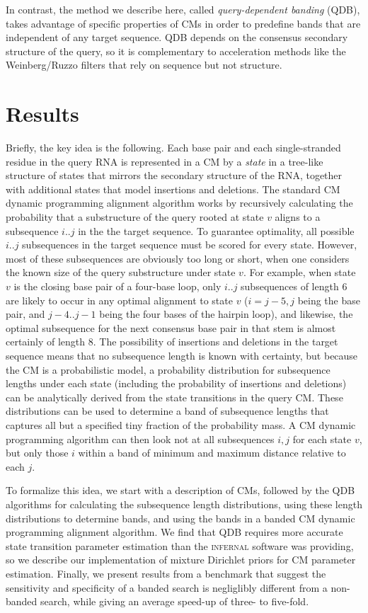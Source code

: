 \documentclass[11pt]{article}
\begin{document}
In contrast, the method we describe here, called \emph{query-dependent
banding} (QDB), takes advantage of specific properties of CMs in order
to predefine bands that are independent of any target sequence.  QDB
depends on the consensus secondary structure of the query, so it is
complementary to acceleration methods like the Weinberg/Ruzzo filters
that rely on sequence but not structure.



\section{Results}

Briefly, the key idea is the following. Each base pair and each
single-stranded residue in the query RNA is represented in a CM by a
\emph{state} in a tree-like structure of states that mirrors the
secondary structure of the RNA, together with additional states that
model insertions and deletions. The standard CM dynamic programming
alignment algorithm works by recursively calculating the probability
that a substructure of the query rooted at state $v$ aligns to a
subsequence $i..j$ in the the target sequence. To guarantee
optimality, all possible $i..j$ subsequences in the target sequence
must be scored for every state.  However, most of these subsequences
are obviously too long or short, when one considers the known size of
the query substructure under state $v$. For example, when state $v$ is
the closing base pair of a four-base loop, only $i..j$ subsequences of
length 6 are likely to occur in any optimal alignment to state $v$
($i=j-5,j$ being the base pair, and $j-4..j-1$ being the four bases of
the hairpin loop), and likewise, the optimal subsequence for the next
consensus base pair in that stem is almost certainly of length 8.  The
possibility of insertions and deletions in the target sequence means
that no subsequence length is known with certainty, but because the CM
is a probabilistic model, a probability distribution for subsequence
lengths under each state (including the probability of insertions and
deletions) can be analytically derived from the state transitions in
the query CM.  These distributions can be used to determine a band of
subsequence lengths that captures all but a specified tiny fraction of
the probability mass. A CM dynamic programming algorithm can then look
not at all subsequences $i,j$ for each state $v$, but only those $i$
within a band of minimum and maximum distance relative to each $j$.

To formalize this idea, we start with a description of CMs, followed
by the QDB algorithms for calculating the subsequence length
distributions, using these length distributions to determine bands,
and using the bands in a banded CM dynamic programming alignment
algorithm.  We find that QDB requires more accurate state transition
parameter estimation than the \textsc{infernal} software was
providing, so we describe our implementation of mixture Dirichlet
priors for CM parameter estimation. Finally, we present results from a
benchmark that suggest the sensitivity and specificity of a banded
search is negliglibly different from a non-banded search, while giving
an average speed-up of three- to five-fold.
\end{document}
